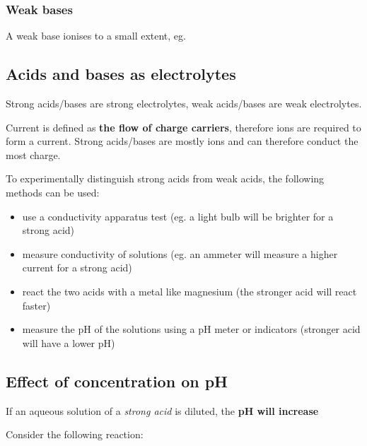 		\subsubsection{Weak bases}
		
			A weak base ionises to a small extent, eg. 

			\begin{center}
			\end{center}
	
	\subsection{Acids and bases as electrolytes}

		Strong acids/bases are strong electrolytes, weak acids/bases are weak electrolytes.

		Current is defined as \textbf{the flow of charge carriers}, therefore ions are required to form a current. Strong acids/bases are mostly ions and can therefore conduct the most charge.

		To experimentally distinguish strong acids from weak acids, the following methods can be used:

		\begin{itemize}
			\item use a conductivity apparatus test (eg. a light bulb will be brighter for a strong acid)
			\item measure conductivity of solutions (eg. an ammeter will measure a higher current for a strong acid)
			\item react the two acids with a metal like magnesium (the stronger acid will react faster)
			\item measure the pH of the solutions using a pH meter or indicators (stronger acid will have a lower pH)
		\end{itemize}

	\subsection{Effect of concentration on pH}
		
		If an aqueous solution of a \textit{strong acid} is diluted, the \textbf{pH will increase}

		Consider the following reaction:

		\begin{center}
		\end{center}
		
